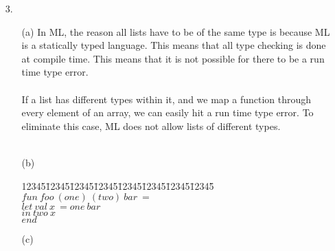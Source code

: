 \documentclass[11pt]{article}
\newenvironment{code}{\begin{tabbing}
12345\=12345\=12345\=12345\=12345\=12345\=12345\=12345\= \kill }
{\end{tabbing}}
\begin{document}
\begin{enumerate}
\item[3. ]
\begin{itemize}
\item[(a)]
In ML, the reason all lists have to be of the same type is because ML is a statically typed language.  This means that all type checking is done at compile time.  This means that it is not possible for there to be a run time type error.  \\ \\
If a list has different types within it, and we map a function through every element of an array, we can easily hit a run time type error.  To eliminate this case, ML does not allow lists of different types.\\ \\
\item[(b)] 
\begin{code}
$fun\ foo\ (one)\ (two)\ bar\ = $\\
\> $let\ val\ x\ = one\ bar$\\
\> $in\ two\ x$ \\
\> $end$\\ 
\end{code}
\item[(c)] 
\end{itemize}
\end{enumerate}
\end{document}
